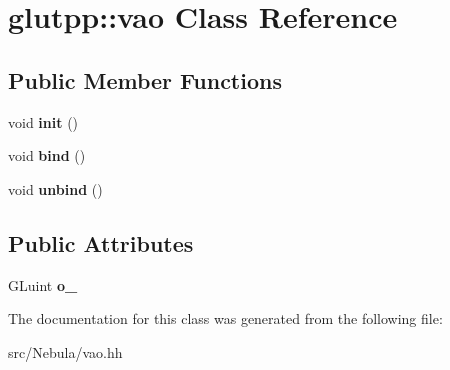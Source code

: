 \hypertarget{classglutpp_1_1vao}{\section{glutpp\-:\-:vao Class Reference}
\label{classglutpp_1_1vao}
}
\subsection*{Public Member Functions}
\begin{DoxyCompactItemize}
\item 
\hypertarget{classglutpp_1_1vao_a8ef0f944ab05f251bb7c2b9c938a32b6}{void {\bfseries init} ()}\label{classglutpp_1_1vao_a8ef0f944ab05f251bb7c2b9c938a32b6}

\item 
\hypertarget{classglutpp_1_1vao_ad162a38b7f0e9749bd6a6c917db70c0c}{void {\bfseries bind} ()}\label{classglutpp_1_1vao_ad162a38b7f0e9749bd6a6c917db70c0c}

\item 
\hypertarget{classglutpp_1_1vao_a2982afed99f8a8bc13ccd27b73f6121d}{void {\bfseries unbind} ()}\label{classglutpp_1_1vao_a2982afed99f8a8bc13ccd27b73f6121d}

\end{DoxyCompactItemize}
\subsection*{Public Attributes}
\begin{DoxyCompactItemize}
\item 
\hypertarget{classglutpp_1_1vao_a8b6c13fec6c3ecae720c6a3e54560a8d}{G\-Luint {\bfseries o\-\_\-}}\label{classglutpp_1_1vao_a8b6c13fec6c3ecae720c6a3e54560a8d}

\end{DoxyCompactItemize}


The documentation for this class was generated from the following file\-:\begin{DoxyCompactItemize}
\item 
src/\-Nebula/vao.\-hh\end{DoxyCompactItemize}
